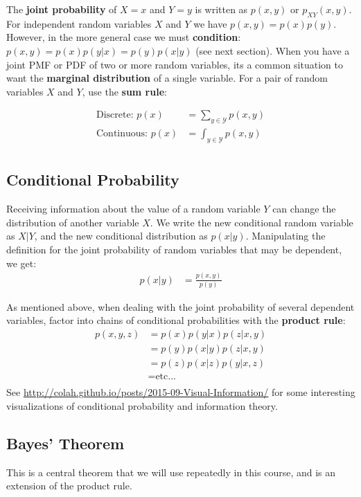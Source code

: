 \documentclass{harvardml}
\theoremstyle{definition}
\theoremstyle{plain}
\newcommand{\mcY}{\mathcal{Y}}
\begin{document}
        The \textbf{joint probability} of $X=x$ and $Y=y$ is written 
		as $p(x,y)$ or $p_{XY}(x,y)$. For independent random variables 
		$X$ and $Y$ we have $p(x,y) = p(x)p(y)$. However, in the more 
		general case we must \textbf{condition}: $p(x,y) = p(x)p(y|x) = 
		p(y)p(x|y)$ (see next section). When you have a joint PMF or PDF 
		of two or more random variables, its a common situation to want 
		the \textbf{marginal distribution} of a single variable. For a 
		pair of random variables $X$ and $Y$, use the \textbf{sum rule}:

        \begin{align*}
            \text{Discrete: } p(x) &= \sum_{y \in \mcY} p(x,y)\\
            \text{Continuous: } p(x) &= \int_{y \in \mcY} p(x,y)\\
        \end{align*}

    \subsection{Conditional Probability}
		Receiving information about the value of a random variable $Y$ 
		can change the distribution of another variable $X$. We write the 
		new conditional random variable as $X|Y$, and the new conditional 
		distribution as $p(x|y)$. Manipulating the definition for the 
		joint probability of random variables that may be dependent, 
		we get:
			\begin{align*}
				p(x|y) &= \frac{p(x,y)}{p(y)}
			\end{align*}

        
        \noindent As mentioned above, when dealing with the joint probability 
        of several dependent variables, factor into chains of conditional 
        probabilities with the \textbf{product rule}:
        \begin{align*}
            p(x,y,z) 
            &= p(x)p(y|x)p(z|x,y) \\
            &= p(y)p(x|y)p(z|x,y) \\
            &= p(z)p(x|z)p(y|x,z) \\
            &= \text{etc...} \\
        \end{align*}
		See \url{http://colah.github.io/posts/2015-09-Visual-Information/}
		for some interesting visualizations of conditional probability 
		and information theory.\\

	\subsection{Bayes' Theorem} 
			This is a central theorem that we will use repeatedly in 
			this course, and is an extension of the product rule. 
\end{document}
